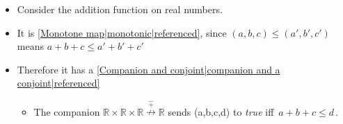 
\begin{itemize}
    \item Consider the addition function on real numbers.
    \item It is \ref{Monotone map|monotonic|referenced}, since $(a,b,c)\leq(a',b',c')$ means $a+b+c\leq a'+b'+c'$
    \item Therefore it has a \ref{Companion and conjoint|companion and a conjoint|referenced}
          \begin{itemize}
            \item The companion $\mathbb{R}\times\mathbb{R}\times\mathbb{R}\overset{\hat +}\nrightarrow \mathbb{R}$ sends (a,b,c,d) to \emph{true} iff \,$a+b+c\leq d$\,.

          \end{itemize}
  \end{itemize}
